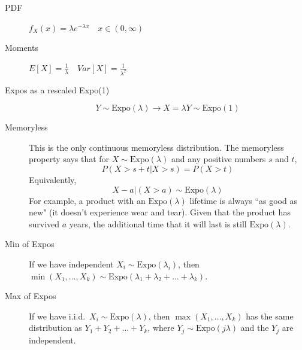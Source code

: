 \documentclass[10pt,landscape]{article}
\newcommand{\Expo}{\textrm{Expo}}
\begin{document}
\begin{multicols*}{3}
\begin{description}
		\item[PDF] $f_X(x) = \lambda e^{-\lambda x} \quad x \in (0, \infty)$ 
		\item[Moments] $E[X]=\frac{1}{\lambda} \quad Var[X] = \frac{1}{\lambda^2}$
		\item[Expos as a rescaled Expo(1)]
		\[Y \sim \Expo(\lambda) \rightarrow X = \lambda Y \sim \Expo(1)\]
												     
												    
		\item[Memoryless] This is the only continuous memoryless distribution. The memoryless property says that for $X \sim \Expo(\lambda)$ and any positive numbers $s$ and $t$,
		\[P(X > s + t | X > s) = P(X > t)\]
		Equivalently,
		\[X - a | (X > a) \sim \Expo(\lambda)\]
		For example, a product with an $\Expo(\lambda)$ lifetime is always ``as good as new" (it doesn't experience wear and tear). Given that the product has survived $a$ years, the additional time that it will last is still $\Expo(\lambda)$. 
												
												
		\item[Min of Expos] If we have independent $X_i \sim \Expo(\lambda_i)$, then $\min(X_1, \dots, X_k) \sim \Expo(\lambda_1 + \lambda_2 + \dots + \lambda_k)$. 
		\item[Max of Expos] If we have i.i.d.~$X_i \sim \Expo(\lambda)$, then $\max(X_1, \dots, X_k)$ has the same distribution as $Y_1+Y_2+\dots+Y_k$, where $Y_j \sim \Expo(j\lambda)$ and the $Y_j$ are independent.     
	\end{description}
									

\end{multicols*}
\end{document}
